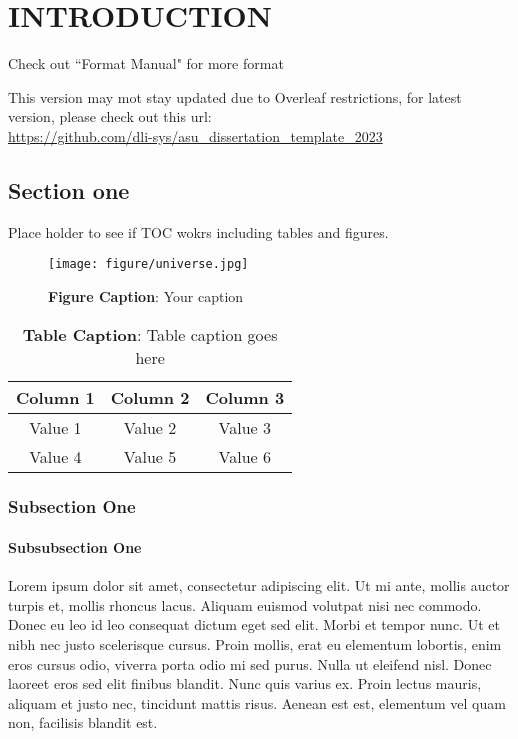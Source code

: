 \chapter{INTRODUCTION}
\label{Introduction}
Check out ``Format Manual" for more format\cite{asu2023}

This version may mot stay updated due to Overleaf restrictions, for latest version, please check out this url: \\ \url{https://github.com/dli-sys/asu_dissertation_template_2023}

\section{Section one}
Place holder to see if TOC wokrs including tables and figures.

\begin{figure}[htbp]
\centering
\texttt{[image: figure/universe.jpg]}
\caption[Figure Caption]{ \centering \textbf{Figure Caption}: Your caption}
\label{fig:universe}
\end{figure}


\begin{table}[h!]
    \centering
    \begin{adjustbox}{width=0.5\textwidth}
        \begin{tabular}{|c|c|c|}\hline
            \multicolumn{1}{|c|}{\textbf{Column 1}} & \multicolumn{1}{c|}{\textbf{Column 2}} & \multicolumn{1}{c|}{\textbf{Column 3}} \\ \hline
            Value 1 & Value 2 & Value 3 \\ \hline
            Value 4 & Value 5 & Value 6 \\ \hline
        \end{tabular}
    \end{adjustbox}
    \caption[Table Caption]{\centering \textbf{Table Caption}: Table caption goes here}
    \label{table:test}
\end{table}


\subsection{Subsection One}
\subsubsection{Subsubsection One}
Lorem ipsum dolor sit amet, consectetur adipiscing elit. Ut mi ante, mollis auctor turpis et, mollis rhoncus lacus. Aliquam euismod volutpat nisi nec commodo. Donec eu leo id leo consequat dictum eget sed elit. Morbi et tempor nunc. Ut et nibh nec justo scelerisque cursus. Proin mollis, erat eu elementum lobortis, enim eros cursus odio, viverra porta odio mi sed purus. Nulla ut eleifend nisl. Donec laoreet eros sed elit finibus blandit. Nunc quis varius ex. Proin lectus mauris, aliquam et justo nec, tincidunt mattis risus. Aenean est est, elementum vel quam non, facilisis blandit est.

